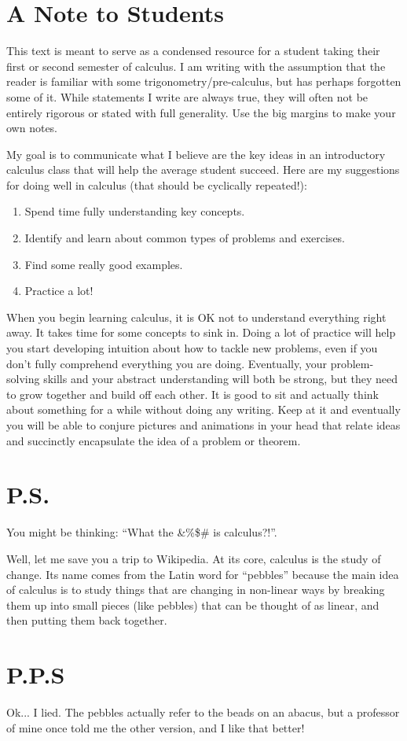 
\section*{A Note to Students}
This text is meant to serve as a condensed resource for a student taking their first or second semester of calculus. I am writing with the assumption that the reader is familiar with some trigonometry/pre-calculus, but has perhaps forgotten some of it. While statements I write are always true, they will often not be entirely rigorous or stated with full generality. Use the big margins to make your own notes.  

My goal is to communicate what I believe are the key ideas in an introductory calculus class that will help the average student succeed. Here are my suggestions for doing well in calculus (that should be cyclically repeated!):

\begin{enumerate}
\item Spend time fully understanding key concepts.
\item Identify and learn about common types of problems and exercises.
\item Find some really good examples.
\item Practice a lot!
\end{enumerate}


When you begin learning calculus, it is OK not to understand everything right away. It takes time for some concepts to sink in. Doing a lot of practice will help you start developing intuition about how to tackle new problems, even if you don't fully comprehend everything you are doing. Eventually, your problem-solving skills and your abstract understanding will both be strong, but they need to grow together and build off each other. It is good to sit and actually think about something for a while without doing any writing. Keep at it and eventually you will be able to conjure pictures and animations in your head that relate ideas and succinctly encapsulate the idea of a problem or theorem.


\section*{P.S.}
You might be thinking: ``What the \&\%\$\# is calculus?!''.

Well, let me save you a trip to Wikipedia. At its core, calculus is the study of change. Its name comes from the Latin word for ``pebbles'' because the main idea of calculus is to study things that are changing in non-linear ways by breaking them up into small pieces (like pebbles) that can be thought of as linear, and then putting them back together.

\section*{P.P.S}
Ok... I lied. The pebbles actually refer to the beads on an abacus, but a professor of mine once told me the other version, and I like that better!


